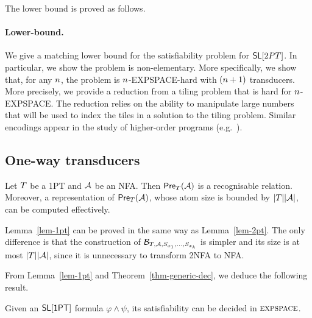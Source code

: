 The lower bound is proved as follows. 


\paragraph{Lower-bound.}

We give a matching lower bound for the satisfiability problem for $\mathsf{SL}[2PT]$. 
In particular, we show the problem is non-elementary.
More specifically, we show that, for any $n$, the problem is $n$-EXPSPACE-hard with $(n+1)$ transducers. More precisely,
we provide a  reduction from a tiling problem that is hard for $n$-EXPSPACE.
The reduction relies on the ability to manipulate large numbers that will be used to index the tiles in a solution to the tiling problem.
Similar encodings appear in the study of higher-order programs (e.g.~\cite{J01,CW07}).


%


\subsection{One-way transducers}


\begin{lemma}\label{lem-1pt}
Let $T$ be a 1PT and $\mathcal{A}$ be an NFA. Then $\textsf{Pre}_{T}(\mathcal{A})$ is a recognisable relation. Moreover, a representation of $\textsf{Pre}_{T}(\mathcal{A})$, whose atom size is bounded by $|T||\mathcal{A}|$, can be computed effectively.
\end{lemma}

Lemma~\ref{lem-1pt} can be proved in the same way as Lemma~\ref{lem-2pt}. The only difference is that the construction of $\mathcal{B}_{T, \mathcal{A}, S_{x_1}, \ldots, S_{x_k}}$ is simpler and its size is at most $|T| |\mathcal{A}|$, since it is unnecessary to transform 2NFA to NFA.

From Lemma~\ref{lem-1pt} and Theorem~\ref{thm-generic-dec}, we deduce the following result.
%
\begin{corollary}
Given an $\textsf{SL}[\textsf{1PT}]$ formula $\varphi \wedge \psi$, its satisfiability can be decided in $\textsc{expspace}$. 
\end{corollary}

